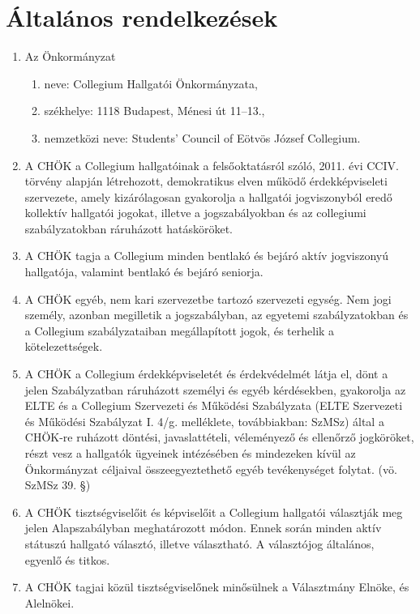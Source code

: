 \documentclass{rulebook}
\begin{document}
\section{Általános rendelkezések}
\begin{enumerate}
	\item Az Önkormányzat 
	\begin{enumerate}
		\item neve: Collegium Hallgatói Önkormányzata, 
		\item székhelye: 1118 Budapest, Ménesi út 11--13.,
		\item nemzetközi neve: Students’ Council of Eötvös József Collegium.
	\end{enumerate}
	
	\item A CHÖK a Collegium hallgatóinak a felsőoktatásról szóló, 2011. évi CCIV. törvény alapján létrehozott, demokratikus elven működő érdekképviseleti szervezete, amely kizárólagosan gyakorolja a hallgatói jogviszonyból eredő kollektív hallgatói jogokat, illetve a jogszabályokban és az collegiumi szabályzatokban ráruházott hatásköröket. 
	
	\item A CHÖK tagja a Collegium minden bentlakó és bejáró aktív jogviszonyú hallgatója, valamint bentlakó és bejáró seniorja.
	\item A CHÖK egyéb, nem kari szervezetbe tartozó szervezeti egység. Nem jogi személy, azonban megilletik a jogszabályban, az egyetemi szabályzatokban és a Collegium szabályzataiban megállapított jogok, és terhelik a kötelezettségek.
	\item A CHÖK a Collegium érdekképviseletét és érdekvédelmét látja el, dönt a jelen Szabályzatban ráruházott személyi és egyéb kérdésekben, gyakorolja az ELTE és a Collegium Szervezeti és Működési Szabályzata (ELTE Szervezeti és Működési Szabályzat I. 4/g. melléklete, továbbiakban: SzMSz) által a CHÖK-re ruházott döntési, javaslattételi, véleményező és ellenőrző jogköröket, részt vesz a hallgatók ügyeinek intézésében és mindezeken kívül az Önkormányzat céljaival összeegyeztethető egyéb tevékenységet folytat. (vö. SzMSz 39. §)
	\item A CHÖK tisztségviselőit és képviselőit a Collegium hallgatói választják meg jelen Alapszabályban meghatározott módon. Ennek során minden aktív státuszú hallgató választó, illetve választható. A választójog általános, egyenlő és titkos. 
	\item A CHÖK tagjai közül tisztségviselőnek minősülnek a Választmány Elnöke, és Alelnökei.
	
\end{enumerate}
\end{document}
